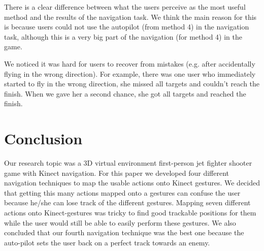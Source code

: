 \documentclass{acm_proc_article-sp}
\begin{document}
There is a clear difference between what the users perceive as the most useful method and the results of the navigation task. We think the main reason for this is because users could not use the autopilot (from method 4) in the navigation task, although this is a very big part of the navigation (for method 4) in the game.

We noticed it was hard for users to recover from mistakes (e.g. after accidentally flying in the wrong direction). For example, there was one user who immediately started to fly in the wrong direction, she missed all targets and couldn't reach the finish. When we gave her a second chance, she got all targets and reached the finish.



\section{Conclusion}
Our research topic was a 3D virtual environment first-person jet fighter shooter game with Kinect navigation.
For this paper we developed four different navigation techniques to map the usable actions onto Kinect gestures. We decided that getting this many actions mapped onto a gestures can confuse the user because he/she can lose track of the different gestures. Mapping seven different actions onto Kinect-gestures was tricky to find good trackable positions for them while the user would still be able to easily perform these gestures.
We also concluded that our fourth navigation technique was the best one because the auto-pilot sets the user back on a perfect track towards an enemy.

%
\nocite{*}


%
%

\balancecolumns
\end{document}
